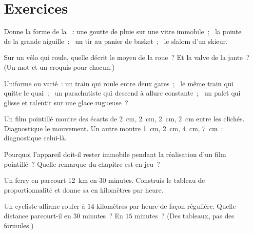 \section{Exercices}

\begin{exercise}[$\star$]\label{exo:g6:describing-motion:1}
Donne la forme de la ~: une goutte de pluie sur une vitre
immobile~; \ la pointe de la grande aiguille~; \ un tir au panier de
basket~; \ le slalom d'un skieur.
\end{exercise}

\begin{exercise}[$\star$]\label{exo:g6:describing-motion:2}
Sur un vélo qui roule, quelle  décrit le moyeu de la
roue~? Et la valve de la jante~? (Un mot et un croquis pour chacun.)
\end{exercise}

\begin{exercise}[$\star$]\label{exo:g6:describing-motion:3}
Uniforme ou varié~: un train qui roule entre deux gares~; \ le même
train qui quitte le quai~; \ un parachutiste qui descend à allure
constante~; \ un palet qui glisse et ralentit sur une glace rugueuse~?
\end{exercise}

\begin{exercise}[$\star$]\label{exo:g6:describing-motion:4}
Un film pointillé montre des écarts de \qty{2}{cm}, \qty{2}{cm},
\qty{2}{cm}, \qty{2}{cm} entre les clichés. Diagnostique le
mouvement. Un autre montre \qty{1}{cm}, \qty{2}{cm}, \qty{4}{cm},
\qty{7}{cm}~: diagnostique celui-là.
\end{exercise}

\begin{exercise}[$\star$]\label{exo:g6:describing-motion:5}
Pourquoi l'appareil doit-il rester immobile pendant la réalisation
d'un film pointillé~? Quelle remarque du chapitre est en jeu~?
\end{exercise}

\begin{exercise}[$\star$]\label{exo:g6:describing-motion:6}
Un ferry en  parcourt \qty{12}{km} en $30$
minutes. Construis le tableau de proportionnalité et donne sa 
en kilomètres par heure.
\end{exercise}

\begin{exercise}[$\star$]\label{exo:g6:describing-motion:7}
Un cycliste affirme rouler à $14$ kilomètres par heure de façon
régulière. Quelle distance parcourt-il en $30$ minutes~? En $15$
minutes~? (Des tableaux, pas des formules.)
\end{exercise}

